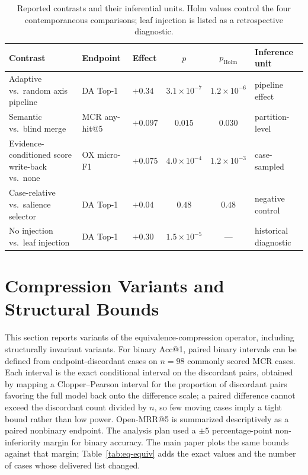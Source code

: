 \documentclass[letterpaper]{article}
\begin{document}
\begin{table}[t]
\centering
\small
\begin{tabular}{@{}lllcc l@{}}
\toprule
Contrast & Endpoint & Effect & $p$ & $p_{\mathrm{Holm}}$ & Inference unit \\
\midrule
Adaptive vs.\ random axis pipeline & DA Top-1 & $+0.34$ & $3.1{\times}10^{-7}$ & $1.2{\times}10^{-6}$ & pipeline effect \\
Semantic vs.\ blind merge & MCR any-hit@5 & $+0.097$ & $0.015$ & $0.030$ & partition-level \\
Evidence-conditioned score write-back vs.\ none & OX micro-F1 & $+0.075$ & $4.0{\times}10^{-4}$ & $1.2{\times}10^{-3}$ & case-sampled \\
Case-relative vs.\ salience selector & DA Top-1 & $+0.04$ & $0.48$ & $0.48$ & negative control \\
\midrule
No injection vs.\ leaf injection & DA Top-1 & $+0.30$ & $1.5{\times}10^{-5}$ & --- & historical diagnostic \\
\bottomrule
\end{tabular}
\caption{Reported contrasts and their inferential units. Holm values control the four contemporaneous comparisons; leaf injection is listed as a retrospective diagnostic.}
\label{tab:confirmatory}
\end{table}

\section{Compression Variants and Structural Bounds}

This section reports variants of the equivalence-compression operator, including structurally invariant variants.
For binary Acc@1, paired binary intervals can be defined from endpoint-discordant cases on $n=98$ commonly scored MCR cases.
Each interval is the exact conditional interval on the discordant pairs, obtained by mapping a Clopper--Pearson interval for the proportion of discordant pairs favoring the full model back onto the difference scale; a paired difference cannot exceed the discordant count divided by $n$, so few moving cases imply a tight bound rather than low power.
Open-MRR@5 is summarized descriptively as a paired nonbinary endpoint.
The analysis plan used a $\pm5$ percentage-point non-inferiority margin for binary accuracy.
The main paper plots the same bounds against that margin; Table~\ref{tab:eq-equiv} adds the exact values and the number of cases whose delivered list changed.
\end{document}
